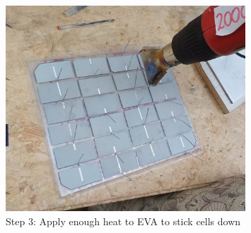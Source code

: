 \documentclass{article}
\theoremstyle{definition}
\theoremstyle{definition}
\theoremstyle{remark}
\begin{document}
\begin{figure}[!ht]
\begin{minipage}{0.25\textwidth}
        \includegraphics[width=0.8\textwidth]{../Images/image_3_3_(step_3).png}
        \caption*{Step 3: Apply enough heat to EVA to stick cells down}
    \end{minipage}
  \end{figure}
\end{document}
